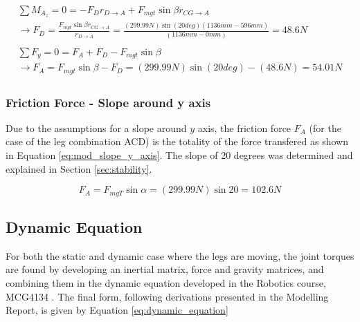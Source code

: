 \begin{gather}
\begin{split}
    \sum M_{A_z} = 0 = -F_D r_{D \rightarrow A} + F_{mgt} \sin{\beta} r_{CG \rightarrow A} 
    \\
    \rightarrow F_D = \frac{F_{mgt} \sin{\beta} r_{CG \rightarrow A}}{r_{D \rightarrow A}} = \frac{(299.99N) \sin{(20 deg)} (1136mm-596mm)}{(1136mm-0mm)} = 48.6 N
\end{split}
    \\
    \begin{split}
        \sum F_y = 0 = F_A + F_D - F_{mgt} \sin{\beta}
        \\
        \rightarrow F_A = F_{mgt}\sin{\beta} - F_D =  (299.99N)\sin{(20 deg)} - (48.6 N) = 54.01 N
    \end{split}
\end{gather}

\subsubsection{Friction Force - Slope around y axis}
Due to the assumptions for a slope around $y$ axis, the friction force $F_A$ (for the case of the leg combination ACD) is the totality of the force transfered as shown in Equation \ref{eq:mod_slope_y_axis}. The slope of 20 degrees was determined and explained in Section \ref{sec:stability}.

\begin{equation}
    F_A = F_{mgT}\sin{\alpha} = (299.99N)\sin{20} = 102.6 N
    \label{eq:mod_slope_y_axis}
\end{equation}


\subsection{Dynamic Equation}

For both the static and dynamic case where the legs are moving, the joint torques are found by developing an inertial matrix, force and gravity matrices, and combining them in the dynamic equation developed in the Robotics course, MCG4134 \cite{al-jarrah_mcg4134:_2019}.
The final form, following derivations presented in the Modelling Report, is given by Equation \ref{eq:dynamic_equation}

